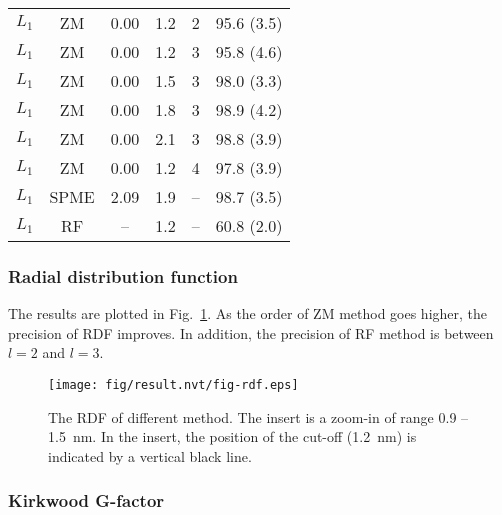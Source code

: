 \documentclass[aip,jcp,a4paper,preprint,unsortedaddress,onecolumn,fleqn]{revtex4-1}
\newcommand{\systemlb}{L_1}
\begin{document}
\begin{table}
\begin{tabular*}{0.5\textwidth}{@{\extracolsep{\fill}}cccc rr}
    $\systemlb$  &       ZM          &       0.00    &       1.2     &       2       &       95.6 (3.5)\\ 
    $\systemlb$  &       ZM          &       0.00    &       1.2     &       3       &       95.8 (4.6)\\ 
    $\systemlb$  &       ZM          &       0.00    &       1.5     &       3       &       98.0 (3.3)\\ 
    $\systemlb$  &       ZM          &       0.00    &       1.8     &       3       &       98.9 (4.2)\\ 
    $\systemlb$  &       ZM          &       0.00    &       2.1     &       3       &       98.8 (3.9)\\ 
    $\systemlb$  &       ZM          &       0.00    &       1.2     &       4       &       97.8 (3.9)\\
   $\systemlb$   & SPME          & 2.09  & 1.9   &       --      &       98.7 (3.5) \\
    $\systemlb$  & RF             & --  & 1.2 & -- & 60.8   (2.0) \\
    \hline\hline
  \end{tabular*}
  \label{tab:tmp2}
\end{table}



\subsubsection{Radial distribution function}
The results are plotted in Fig.~\ref{fig:rdf}. As the order of ZM method goes higher, the precision of RDF improves. In addition, the precision of RF method is between $l=2$ and $l=3$.
\begin{figure}
  \centering
  \texttt{[image: fig/result.nvt/fig-rdf.eps]}  
  \caption{The RDF of different method. The insert is a zoom-in of range 0.9 -- 1.5~nm. In the insert, the position of the cut-off (1.2~nm) is indicated by a vertical black line.}
  \label{fig:rdf}
\end{figure}


\subsubsection{Kirkwood G-factor}
\end{document}
